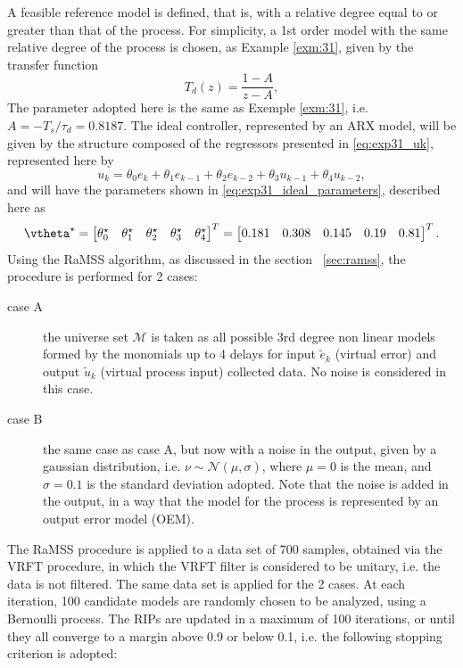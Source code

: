\begin{exmp}
  A feasible reference model is defined, that is, with a relative degree equal to or greater than that of the process. For simplicity, a 1st order model with the same relative degree of the process is chosen, as Example \ref{exm:31}, given by the transfer function
  \begin{equation}
    T_d(z) = \frac{1-A}{z-A},
    \label{eq:mr_sis2aord}
  \end{equation}
  The parameter adopted here is the same as Exemple \ref{exm:31}, i.e. $A = -T_s/\tau_d = 0.8187$. 
  The ideal controller, represented by an ARX model, will be given by the structure composed of the regressors presented in \eqref{eq:exp31_uk}, represented here by
  \begin{equation}
    \label{eq:exp51_contIdeal}
    u_k = \theta_0e_{k} + \theta_1e_{k-1} + \theta_2e_{k-2} + \theta_3u_{k-1} + \theta_4u_{k-2},
  \end{equation}
  and will have the parameters shown in \eqref{eq:exp31_ideal_parameters}, described here as
  \begin{equation}
    \vtheta^\star= \begin{bmatrix} \theta^\star_0 & \theta^\star_1 & \theta^\star_2 & \theta^\star_3 & \theta^\star_4 \end{bmatrix}^T =  \begin{bmatrix} 0.181 & 0.308 &  0.145 &  0.19 & 0.81 \end{bmatrix}^T.
  \label{eq:ex51_ideal_parameters}
\end{equation}
Using the RaMSS algorithm, as discussed in the section ~\ref{sec:ramss}, the procedure is performed for 2 cases:
\begin{description}
  \item[case A] the universe set $\mathscr{M}$ is taken as all possible 3rd degree non linear models formed by the monomials up to 4 delays for input $\tilde{e}_k$ (virtual error) and output $\tilde{u}_k$ (virtual process input) collected data. No noise is considered in this case.
  \item[case B] the same case as case A, but now with a noise in the output, given by a gaussian distribution, i.e. $\nu \sim \mathcal{N}(\mu,\sigma)$, where $\mu=0$ is the mean, and $\sigma= 0.1$ is the standard deviation adopted. Note that the noise is added in the output, in a way that the model for the process is represented by an output error model (OEM).
\end{description}
The RaMSS procedure is applied to a data set of 700 samples, obtained via the VRFT procedure, in which the VRFT filter is considered to be unitary, i.e. the data is not filtered. The same data set is applied for the 2 cases. At each iteration, 100 candidate models are randomly chosen to be analyzed, using a Bernoulli process. The RIPs are updated in a maximum of 100 iterations, or until they all converge to a margin above 0.9 or below 0.1, i.e. the following stopping criterion is adopted:

\end{exmp}

